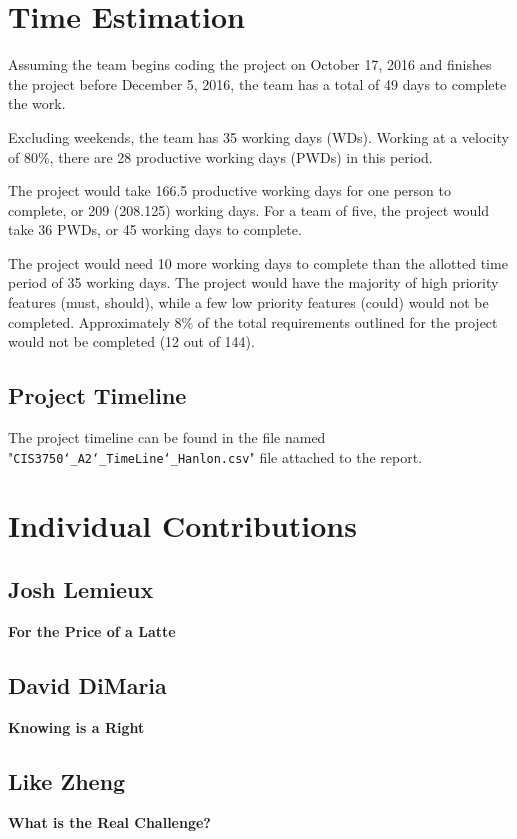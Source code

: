 \documentclass[12pt,letterpaper]{article}
\begin{document}
\clearpage
\section{Time Estimation}
Assuming the team begins coding the project on October 17, 2016 and finishes the project before December 5, 2016, the team has a total of 49 days to complete the work. \par
Excluding weekends, the team has 35 working days (WDs). Working at a velocity of 80\%, there are 28 productive working days (PWDs) in this period. \par
The project would take 166.5 productive working days for one person to complete, or 209 (208.125) working days. For a team of five, the project would take 36 PWDs, or 45 working days to complete. \par
The project would need 10 more working days to complete than the allotted time period of 35 working days. The project would have the majority of high priority features (must, should), while a few low priority features (could) would not be completed. Approximately 8\% of the total requirements outlined for the project would not be completed (12 out of 144).

\subsection{Project Timeline}
The project timeline can be found in the file named "\texttt{CIS3750\char`_A2\char`_TimeLine\char`_Hanlon.csv}" file attached to the report.

\clearpage
\section{Individual Contributions}
\subsection{Josh Lemieux}
\textbf{For the Price of a Latte}\par


\clearpage
\subsection{David DiMaria}
\textbf{Knowing is a Right}

\clearpage
\subsection{Like Zheng}
\textbf{What is the Real Challenge?}\par
\end{document}
